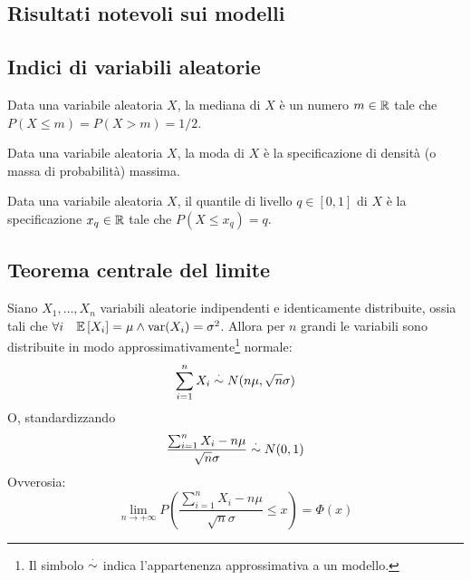 \subsection{Risultati notevoli sui modelli}

\subsection{Indici di variabili aleatorie}
\begin{defin}
	Data una variabile aleatoria $X$, la mediana di $X$ è un numero $m\in\mathbb R$ tale che $P(X\leq m) = P(X>m) = 1/2$.
\end{defin}

\begin{defin}
	Data una variabile aleatoria $X$, la moda di $X$ è la specificazione di densità (o massa di probabilità) massima.
\end{defin}

\begin{defin}
	Data una variabile aleatoria $X$, il quantile di livello $q\in[0,1]$ di $X$ è la specificazione $x_q\in\mathbb R$ tale che $P(X\leq x_q) = q$.
\end{defin}


\subsection{Teorema centrale del limite}
\begin{teor}
	Siano $X_1,\dots,X_n$ variabili aleatorie indipendenti e identicamente distribuite, ossia tali che $\forall i\quad\mathbb{E}\left[ X_i \right]=\mu\land\operatorname{var}(X_i)=\sigma^2$. Allora per $n$ grandi le variabili sono distribuite in modo approssimativamente\footnote{Il simbolo $\overset{\cdot}{\sim}$ indica l'appartenenza approssimativa a un modello.} normale:
	\begin{gather*}
		\sum_{i=1}^n X_i \overset{\cdot}{\sim} N(n\mu,\sqrt{n}\sigma) \\
	\end{gather*}
	O, standardizzando
	\begin{equation*}
		\frac{\sum_{i=1}^n X_i-n\mu}{\sqrt{n}\sigma} \overset{\cdot}{\sim} N(0,1)
	\end{equation*}
	Ovverosia:
	\begin{equation*}
		\lim_{n\to+\infty} P\left(\frac{\sum_{i=1}^n X_i-n\mu}{\sqrt{n}\sigma}\leq x\right) = \Phi(x)
	\end{equation*}
\end{teor}

